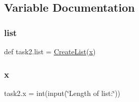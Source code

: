 \subsection{Variable Documentation}
\mbox{\label{namespacetask2_ae064a067356f3a11da88a2d0c5828ae2}} 
\subsubsection{\texorpdfstring{list}{list}}
{\footnotesize\ttfamily def task2.\+list = \hyperlink{namespacetask2_acebb1f2f815d506b515020c064cf9b72}{Create\+List}(\hyperlink{namespacetask2_a360b9d244b8178b33bda24326c711504}{x})}

\mbox{\label{namespacetask2_a360b9d244b8178b33bda24326c711504}} 
\subsubsection{\texorpdfstring{x}{x}}
{\footnotesize\ttfamily task2.\+x = int(input(\char`\"{}Length of list\+:\char`\"{}))}

